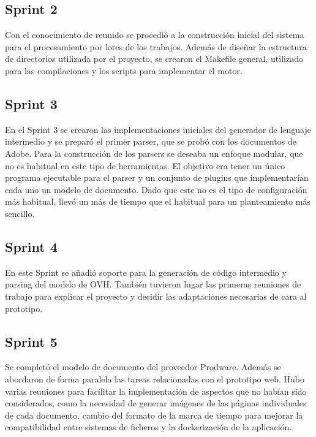 \subsection{Sprint 2}

Con el conocimiento de reunido se procedió a la construcción inicial del sistema para el procesamiento por lotes de los trabajos. Además de diseñar la estructura de directorios utilizada por el proyecto, se crearon el Makefile general, utilizado para las compilaciones y los scripts para implementar el motor.

\subsection{Sprint 3}

En el Sprint 3 se crearon las implementaciones iniciales del generador de lenguaje intermedio y se preparó el primer parser, que se probó con los documentos de Adobe. Para la construcción de los parsers se deseaba un enfoque modular, que no es habitual en este tipo de herramientas. El objetivo era tener un único programa ejecutable para el parser y un conjunto de plugins que implementarían cada uno un modelo de documento. Dado que este no es el tipo de configuración más habitual, llevó un más de tiempo que el habitual para un planteamiento más sencillo.

\subsection{Sprint 4}

En este Sprint se añadió soporte para la generación de código intermedio y parsing del modelo de OVH. También tuvieron lugar las primeras reuniones de trabajo para explicar el proyecto y decidir las adaptaciones necesarias de cara al prototipo.

\subsection{Sprint 5}

Se completó el modelo de documento del proveedor Prodware. Además se abordaron de forma paralela las tareas relacionadas con el prototipo web. Hubo varias reuniones para facilitar la implementación de aspectos que no habían sido considerados, como  la necesidad de generar imágenes de las páginas individuales de cada documento, cambio del formato de la marca de tiempo para mejorar la compatibilidad entre sistemas de ficheros y la dockerización de la aplicación.


